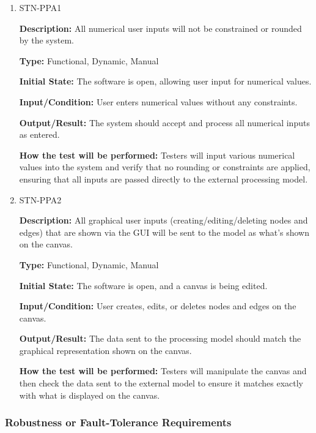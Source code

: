 \documentclass[12pt, titlepage]{article}
\begin{document}
\begin{enumerate}

\item{STN-PPA1\\}

\textbf{Description:} All numerical user inputs will not be constrained or rounded by the system.

\textbf{Type:} Functional, Dynamic, Manual

\textbf{Initial State:} The software is open, allowing user input for numerical values.

\textbf{Input/Condition:} User enters numerical values without any constraints.

\textbf{Output/Result:} The system should accept and process all numerical inputs as entered.

\textbf{How the test will be performed:} Testers will input various numerical values into the system and verify that no rounding or constraints are applied, ensuring that all inputs are passed directly to the external processing model.

\item{STN-PPA2\\}

\textbf{Description:} All graphical user inputs (creating/editing/deleting nodes and edges) that are shown via the GUI will be sent to the model as what’s shown on the canvas.

\textbf{Type:} Functional, Dynamic, Manual

\textbf{Initial State:} The software is open, and a canvas is being edited.

\textbf{Input/Condition:} User creates, edits, or deletes nodes and edges on the canvas.

\textbf{Output/Result:} The data sent to the processing model should match the graphical representation shown on the canvas.

\textbf{How the test will be performed:} Testers will manipulate the canvas and then check the data sent to the external model to ensure it matches exactly with what is displayed on the canvas.

\end{enumerate}

\subsubsection{Robustness or Fault-Tolerance Requirements}
\end{document}
